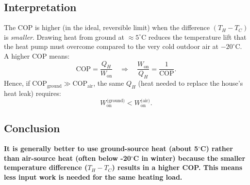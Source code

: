 \documentclass[12pt]{article}
\theoremstyle{definition} %
\theoremstyle{plain} %
\begin{document}
\subsection*{Interpretation}
The COP is higher (in the ideal, reversible limit) when the difference $(T_H - T_C)$ is \emph{smaller}. Drawing heat from ground at $\approx 5^\circ\mathrm{C}$ reduces the temperature lift that the heat pump must overcome compared to the very cold outdoor air at $-20^\circ\mathrm{C}$. A higher COP means:
\[
\text{COP} = \frac{Q_H}{W_{\text{on}}}
\quad \Longrightarrow \quad
\frac{W_{\text{on}}}{Q_H} = \frac{1}{\text{COP}}.
\]
Hence, if $\text{COP}_\text{ground} \gg \text{COP}_\text{air}$, the same $Q_H$ (heat needed to replace the house's heat leak) requires:
\[
W_{\text{on}}^\text{(ground)} 
< W_{\text{on}}^\text{(air)}.
\]

\subsection*{Conclusion}
\textbf{It is generally better to use ground-source heat (about 5$^\circ$C) rather than air-source heat (often below -20$^\circ$C in winter) because the smaller temperature difference ($T_H - T_C$) results in a higher COP. This means less input work is needed for the same heating load.}
\end{document}
